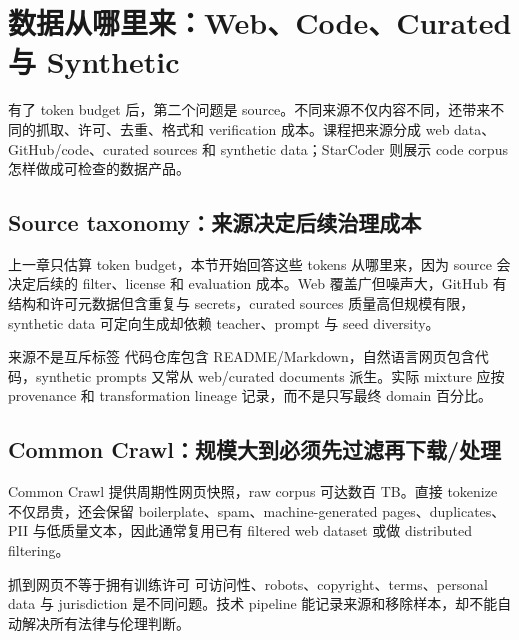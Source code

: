 \section{数据从哪里来：Web、Code、Curated 与 Synthetic}

有了 token budget 后，第二个问题是 source。不同来源不仅内容不同，还带来不同的抓取、许可、去重、格式和 verification 成本。课程把来源分成 web data、GitHub/code、curated sources 和 synthetic data；StarCoder 则展示 code corpus 怎样做成可检查的数据产品。

\subsection{Source taxonomy：来源决定后续治理成本}

上一章只估算 token budget，本节开始回答这些 tokens 从哪里来，因为 source 会决定后续的 filter、license 和 evaluation 成本。Web 覆盖广但噪声大，GitHub 有结构和许可元数据但含重复与 secrets，curated sources 质量高但规模有限，synthetic data 可定向生成却依赖 teacher、prompt 与 seed diversity。


\begin{knowledgebox}{来源不是互斥标签}
代码仓库包含 README/Markdown，自然语言网页包含代码，synthetic prompts 又常从 web/curated documents 派生。实际 mixture 应按 provenance 和 transformation lineage 记录，而不是只写最终 domain 百分比。
\end{knowledgebox}

\subsection{Common Crawl：规模大到必须先过滤再下载/处理}

Common Crawl 提供周期性网页快照，raw corpus 可达数百 TB。直接 tokenize 不仅昂贵，还会保留 boilerplate、spam、machine-generated pages、duplicates、PII 与低质量文本，因此通常复用已有 filtered web dataset 或做 distributed filtering。


\begin{warningbox}{抓到网页不等于拥有训练许可}
可访问性、robots、copyright、terms、personal data 与 jurisdiction 是不同问题。技术 pipeline 能记录来源和移除样本，却不能自动解决所有法律与伦理判断。
\end{warningbox}

